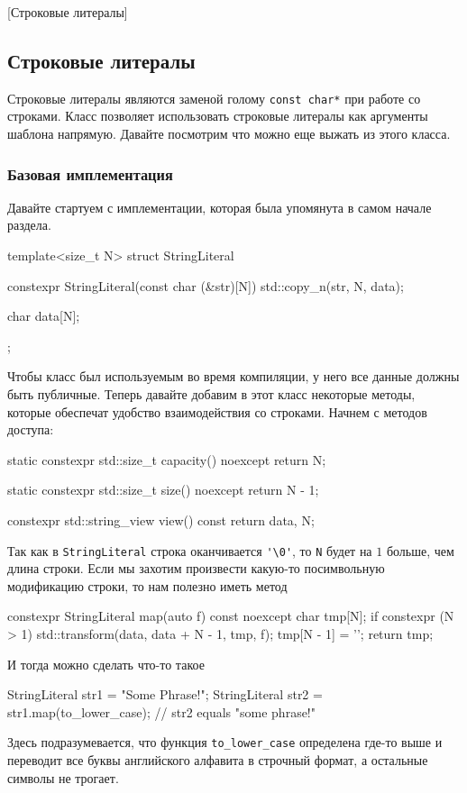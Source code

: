[Строковые литералы]


\subsection{Строковые литералы}

Строковые литералы являются заменой голому \verb"const char*" при работе со строками.
Класс позволяет использовать строковые литералы как аргументы шаблона напрямую.
Давайте посмотрим что можно еще выжать из этого класса.

\subsubsection{Базовая имплементация}

Давайте стартуем с имплементации, которая была упомянута в самом начале раздела.
\begin{cppcode}
template<size_t N>
struct StringLiteral {
  constexpr StringLiteral(const char (&str)[N]) {
    std::copy_n(str, N, data);
  }

  char data[N]{};
};
\end{cppcode}
Чтобы класс был используемым во время компиляции, у него все данные должны быть публичные.
Теперь давайте добавим в этот класс некоторые методы, которые обеспечат удобство взаимодействия со строками.
Начнем с методов доступа:
\begin{cppcode}
static constexpr std::size_t capacity() noexcept {
  return N;
}

static constexpr std::size_t size() noexcept {
  return N - 1;
}

constexpr std::string_view view() const {
  return {data, N};
}
\end{cppcode}
Так как в \verb"StringLiteral" строка оканчивается \verb"'\0'", то \verb"N" будет на $1$ больше, чем длина строки.
Если мы захотим произвести какую-то посимвольную модификацию строки, то нам полезно иметь метод
\begin{cppcode}
constexpr StringLiteral map(auto f) const noexcept {
  char tmp[N];
  if constexpr (N > 1)
    std::transform(data, data + N - 1, tmp, f);
  tmp[N - 1] = '\0';
  return tmp;
}
\end{cppcode}
И тогда можно сделать что-то такое
\begin{cppcode}
StringLiteral str1 = "Some Phrase!";
StringLiteral str2 = str1.map(to_lower_case);
// str2 equals "some phrase!"
\end{cppcode}
Здесь подразумевается, что функция \verb"to_lower_case" определена где-то выше и переводит все буквы английского алфавита в строчный формат, а остальные символы не трогает.


